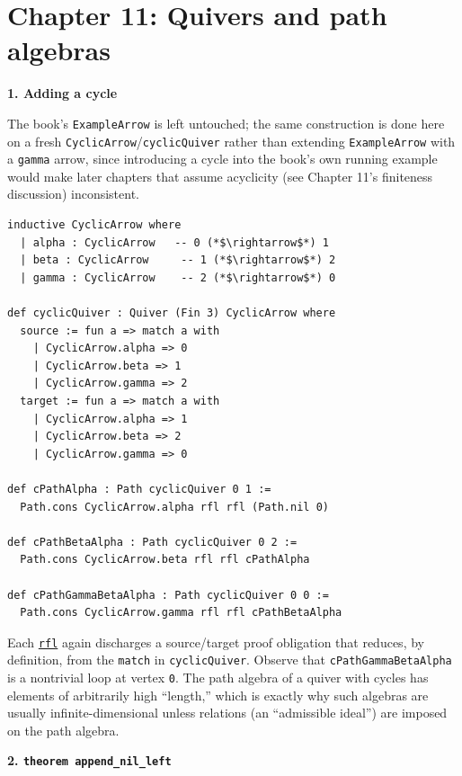 \section{Chapter 11: Quivers and path algebras}\label{sec:14-appendix-solutions:10-chapter-11:1}

\textbf{1. Adding a cycle}

The book's \texttt{ExampleArrow} is left untouched; the same construction is done here on a fresh \texttt{CyclicArrow}/\texttt{cyclicQuiver} rather than extending \texttt{ExampleArrow} with a \texttt{gamma} arrow, since introducing a cycle into the book's own running example would make later chapters that assume acyclicity (see Chapter 11's finiteness discussion) inconsistent.

\begin{lstlisting}
inductive CyclicArrow where
  | alpha : CyclicArrow   -- 0 (*$\rightarrow$*) 1
  | beta : CyclicArrow     -- 1 (*$\rightarrow$*) 2
  | gamma : CyclicArrow    -- 2 (*$\rightarrow$*) 0

def cyclicQuiver : Quiver (Fin 3) CyclicArrow where
  source := fun a => match a with
    | CyclicArrow.alpha => 0
    | CyclicArrow.beta => 1
    | CyclicArrow.gamma => 2
  target := fun a => match a with
    | CyclicArrow.alpha => 1
    | CyclicArrow.beta => 2
    | CyclicArrow.gamma => 0

def cPathAlpha : Path cyclicQuiver 0 1 :=
  Path.cons CyclicArrow.alpha rfl rfl (Path.nil 0)

def cPathBetaAlpha : Path cyclicQuiver 0 2 :=
  Path.cons CyclicArrow.beta rfl rfl cPathAlpha

def cPathGammaBetaAlpha : Path cyclicQuiver 0 0 :=
  Path.cons CyclicArrow.gamma rfl rfl cPathBetaAlpha
\end{lstlisting}

Each \href{https://lean-lang.org/doc/reference/latest/Tactic-Proofs/Tactic-Reference/}{\texttt{rfl}} again discharges a source/target proof obligation that reduces, by definition, from the \texttt{match} in \texttt{cyclicQuiver}. Observe that \texttt{cPathGammaBetaAlpha} is a nontrivial loop at vertex \texttt{0}. The path algebra of a quiver with cycles has elements of arbitrarily high ``length,'' which is exactly why such algebras are usually infinite-dimensional unless relations (an ``admissible ideal'') are imposed on the path algebra.

\textbf{2. \texttt{theorem append\_\allowbreak{}nil\_\allowbreak{}left}}

